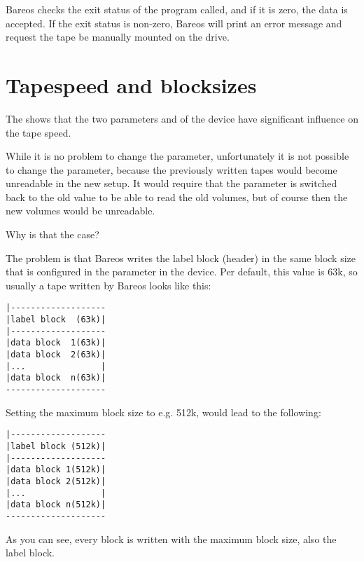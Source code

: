 Bareos checks the exit status of the program called, and if it is zero, the
data is accepted. If the exit status is non-zero, Bareos will print an
error message and request the tape be manually mounted on the drive.


\section{Tapespeed and blocksizes}
\label{Tapespeed and blocksizes}
\label{setblocksizes}

The \bareosWhitepaperTapeSpeedTuning shows that the two parameters
 and 
of the device have significant influence on the tape speed.

While it is no problem to change the  parameter,
unfortunately it is not possible to change the 
parameter, because the previously written tapes would become unreadable
in the new setup. It would require that the  parameter
is switched back to the old value to be able to read the old volumes, but
of course then the new volumes would be unreadable.

Why is that the case?

The problem is that Bareos writes the label block (header) in the same block
size that is configured in the  parameter in the device.
Per default, this value is 63k, so usually a tape written by Bareos looks like this:

\begin{verbatim}
|-------------------
|label block  (63k)|
|-------------------
|data block  1(63k)|
|data block  2(63k)|
|...               |
|data block  n(63k)|
--------------------
\end{verbatim}
Setting the maximum block size to e.g. 512k, would lead to the following:
\begin{verbatim}
|-------------------
|label block (512k)|
|-------------------
|data block 1(512k)|
|data block 2(512k)|
|...               |
|data block n(512k)|
--------------------
\end{verbatim}

As you can see, every block is written with the maximum block size, also the label block.

